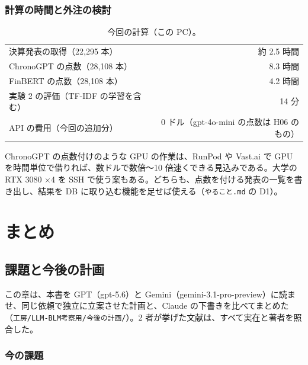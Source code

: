 \documentclass[xelatex,ja=standard,jafont=haranoaji,a4paper,10pt]{bxjsreport}
\newcommand{\code}[1]{\texttt{#1}}
\begin{document}
\section{計算の時間と外注の検討}

\begin{table}[H]
\centering
\caption{今回の計算（この PC）。}
\small
\begin{tabular}{lr}
\toprule
決算発表の取得（22,295 本） & 約 2.5 時間 \\
ChronoGPT の点数（28,108 本） & 8.3 時間 \\
FinBERT の点数（28,108 本） & 4.2 時間 \\
実験 2 の評価（TF-IDF の学習を含む） & 14 分 \\
API の費用（今回の追加分） & 0 ドル（gpt-4o-mini の点数は H06 のもの） \\
\bottomrule
\end{tabular}
\end{table}

ChronoGPT の点数付けのような GPU の作業は、RunPod や Vast.ai で GPU を時間単位で借りれば、数ドルで数倍〜10 倍速くできる見込みである。大学の RTX 3080 ×4 を SSH で使う案もある。どちらも、点数を付ける発表の一覧を書き出し、結果を DB に取り込む機能を足せば使える（\code{やること.md} の D1）。

\part{まとめ}

\chapter{課題と今後の計画}\label{ch:future}

この章は、本書を GPT（gpt-5.6）と Gemini（gemini-3.1-pro-preview）に読ませ、同じ依頼で独立に立案させた計画と、Claude の下書きを比べてまとめた（\code{工房/LLM-BLM考察用/今後の計画/}）。2 者が挙げた文献は、すべて実在と著者を照合した。

\section{今の課題}
\end{document}

